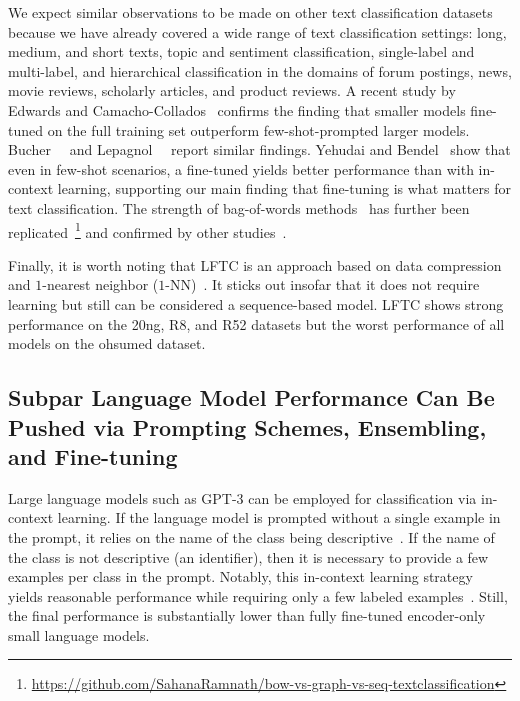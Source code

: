 We expect similar observations to be made on other text classification datasets because we have already covered a wide range of text classification settings: 
long, medium, and short texts, topic and sentiment classification, single-label and multi-label, and hierarchical classification in the domains of forum postings, news, movie reviews, scholarly articles, and product reviews. A recent study by Edwards and Camacho-Collados~\cite{edwards2024language} confirms the finding that smaller models fine-tuned on the full training set outperform few-shot-prompted larger models. 
Bucher~\etal~\cite{bucher2024finetunedsmallllmsstill} and Lepagnol~\etal~\cite{lepagnol2024smalllanguagemodelsgood} report similar findings.
Yehudai and Bendel~\cite{yehudai2024fastfit} show that even in few-shot scenarios, a fine-tuned \SLM yields better performance than \GenLMs with in-context learning,
supporting our main finding that fine-tuning is what matters for text classification.
The strength of bag-of-words methods~\cite{galkescherp-acl2022} has further been replicated~\cite{usc-students}\footnote{\url{https://github.com/SahanaRamnath/bow-vs-graph-vs-seq-textclassification}}
and confirmed by other studies~\cite{DBLP:journals/debu/ZhangLDXSM21}.

Finally, it is worth noting that LFTC is an approach based on data compression and $1$-nearest neighbor ($1$-NN)~\cite{mao2024lowresourcefasttextclassification}.
It sticks out insofar that it does not require learning but still can be considered a sequence-based model.
LFTC shows strong performance on the 20ng, R8, and R52 datasets but the worst performance of all models on the ohsumed dataset.

\subsection{Subpar Language Model Performance Can Be Pushed via Prompting Schemes, Ensembling, and Fine-tuning}
Large language models such as GPT-3 can be employed for classification via in-context learning.  If the language model is prompted without a single example in the prompt, it relies on the name of the class being descriptive~\cite{DBLP:journals/csur/Sebastiani02}. 
If the name of the class is not descriptive (\eg an identifier), then it is necessary to provide a few examples per class in the prompt. Notably, this in-context learning strategy yields reasonable performance while requiring only a few labeled examples~\cite{carp,DBLP:journals/corr/abs-2402-07470-pushing-the-limit}. 
Still, the final performance is substantially lower than fully fine-tuned encoder-only small language models.

